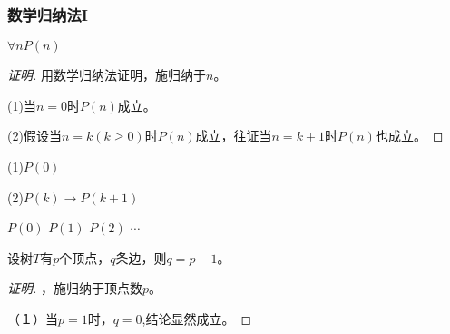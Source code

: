 \documentclass{beamer}
\begin{document}
\begin{CJK*}{UTF8}{gbsn}
\begin{frame}
\end{frame}

\begin{frame}
  \frametitle{数学归纳法I}

  \begin{Thm2} 
  $\forall n P(n)$   
\end{Thm2}\pause
\begin{proof}[证明]
  用数学归纳法证明，施归纳于$n$。\pause

  (1)当$n=0$时$P(n)$成立。\pause

  (2)假设当$n=k(k\geq 0)$时$P(n)$成立，往证当$n=k+1$时$P(n)$也成立。
\end{proof}
\pause
(1)$P(0)$\pause

(2)$P(k)\to P(k+1)$

\pause
$P(0)$ \pause $P(1)$ \pause  $P(2)$ \pause $\cdots$
  
\end{frame}

\begin{frame}
\begin{Thm1}
  设树$T$有$p$个顶点，$q$条边，则$q = p-1$。
\end{Thm1}\pause
\begin{proof}[证明]\justifying\let\raggedright\justifying
    ，施归纳于顶点数$p$。\pause
    
    （１）当$p=1$时，$q=0$,结论显然成立。\pause


\end{proof}
\end{frame}
\end{CJK*}
\end{document}
